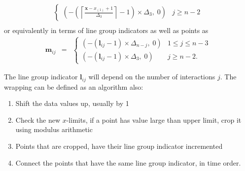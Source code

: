 \documentclass[12pt]{article}
\begin{document}
\begin{itemize}
\begin{eqnarray*}
\begin{cases}
(-\left(\left\lceil \frac{\mathbf{x}-x_{(1)}+1}{\Delta_3}\right\rceil -1\right)\times\Delta_3, \; 0) & j\ge n-2
\end{cases} \\ 
\end{eqnarray*}
or equivalently in terms of line group indicators as well as points as
\begin{eqnarray*}
\mathbf{m}{}_{ij} & = & \begin{cases}
(-(\mathbf{l}{}_{ij} -1)\times\Delta_{n-j}, \; 0) & 1\leq j \leq n-3 \\
(-(\mathbf{l}{}_{ij} -1)\times\Delta_3, \; 0) & j\ge n-2.
\end{cases}
\end{eqnarray*}

The line group indicator $\mathbf{l}{}_{ij}$ will depend on the number of interactions $j$. The wrapping can be defined as an algorithm also:

\begin{enumerate} \itemsep 0in
\item Shift the data values up, usually by 1
\item Check the new $x$-limits, if a point has value large than upper limit, crop it using modulus arithmetic
\item Points that are cropped, have their line group indicator incremented
\item Connect the points that have the same line group indicator, in time order.
\end{enumerate}


\end{itemize}
\end{document}
